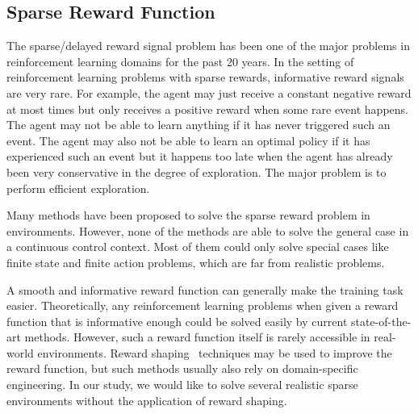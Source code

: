 \subsection{Sparse Reward Function}
The sparse/delayed reward signal problem has been one of the major problems in reinforcement learning domains for the past 20 years. In the setting of reinforcement learning problems with sparse rewards, informative reward signals are very rare. For example, the agent may just receive a constant negative reward at most times but only receives a positive reward when some rare event happens. The agent may not be able to learn anything if it has never triggered such an event. The agent may also not be able to learn an optimal policy if it has experienced such an event but it happens too late when the agent has already been very conservative in the degree of exploration. The major problem is to perform efficient exploration.

Many methods have been proposed to solve the sparse reward problem in environments. However, none of the methods are able to solve the general case in a continuous control context. Most of them could only solve special cases like finite state and finite action problems, which are far from realistic problems.

A smooth and informative reward function can generally make the training task easier. Theoretically, any reinforcement learning problems when given a reward function that is informative enough could be solved easily by current state-of-the-art methods. However, such a reward function itself is rarely accessible in real-world environments. Reward shaping~\cite{ng1999policy} techniques may be used to improve the reward function, but such methods usually also rely on domain-specific engineering. In our study, we would like to solve several realistic sparse environments without the application of reward shaping.


